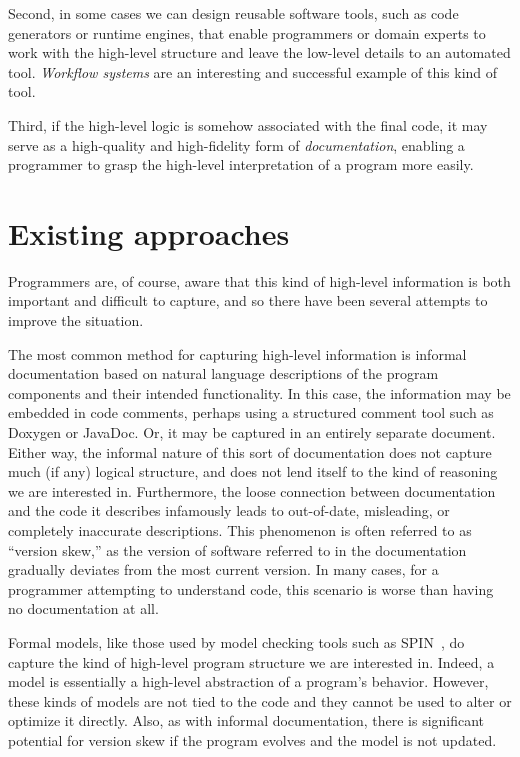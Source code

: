 Second, in some cases we can design reusable software tools, such
as code generators or runtime engines, that enable programmers or
domain experts to work with the high-level structure and leave the
low-level details to an automated tool. \emph{Workflow systems}
are an interesting and successful example of this kind of tool.

Third, if the high-level logic is somehow associated with the
final code, it may serve as a high-quality and high-fidelity form
of \emph{documentation}, enabling a programmer to grasp the
high-level interpretation of a program more easily.

\section{Existing approaches}

Programmers are, of course, aware that this kind of high-level
information is both important and difficult to capture, and so
there have been several attempts to improve the situation.

The most common method for capturing high-level information is
informal documentation based on natural language descriptions of
the program components and their intended functionality. In this
case, the information may be embedded in code comments, perhaps
using a structured comment tool such as Doxygen or JavaDoc. Or, it
may be captured in an entirely separate document. Either way, the
informal nature of this sort of documentation does not capture
much (if any) logical structure, and does not lend itself to the
kind of reasoning we are interested in. Furthermore, the loose
connection between documentation and the code it describes
infamously leads to out-of-date, misleading, or completely
inaccurate descriptions. This phenomenon is often referred to as
``version skew,'' as the version of software referred to in the
documentation gradually deviates from the most current version. In
many cases, for a programmer attempting to understand code, this
scenario is worse than having no documentation at all.

Formal models, like those used by model checking tools such as
SPIN~\cite{spin}, do capture the kind of high-level program
structure we are interested in. Indeed, a model is essentially a
high-level abstraction of a program's behavior. However, these
kinds of models are not tied to the code and they cannot be used
to alter or optimize it directly. Also, as with informal
documentation, there is significant potential for version skew if
the program evolves and the model is not updated.

